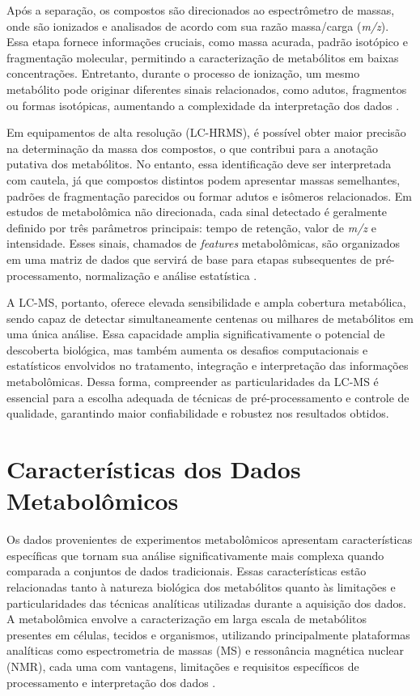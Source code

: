 Após a separação, os compostos são direcionados ao espectrômetro de massas, onde são ionizados e analisados de acordo com sua razão massa/carga (\textit{m/z}). Essa etapa fornece informações cruciais, como massa acurada, padrão isotópico e fragmentação molecular, permitindo a caracterização de metabólitos em baixas concentrações. Entretanto, durante o processo de ionização, um mesmo metabólito pode originar diferentes sinais relacionados, como adutos, fragmentos ou formas isotópicas, aumentando a complexidade da interpretação dos dados \cite{mahieu2017systems}.

Em equipamentos de alta resolução (LC-HRMS), é possível obter maior precisão na determinação da massa dos compostos, o que contribui para a anotação putativa dos metabólitos. No entanto, essa identificação deve ser interpretada com cautela, já que compostos distintos podem apresentar massas semelhantes, padrões de fragmentação parecidos ou formar adutos e isômeros relacionados. Em estudos de metabolômica não direcionada, cada sinal detectado é geralmente definido por três parâmetros principais: tempo de retenção, valor de \textit{m/z} e intensidade. Esses sinais, chamados de \textit{features} metabolômicas, são organizados em uma matriz de dados que servirá de base para etapas subsequentes de pré-processamento, normalização e análise estatística \cite{schrimpe2016untargeted}.

A LC-MS, portanto, oferece elevada sensibilidade e ampla cobertura metabólica, sendo capaz de detectar simultaneamente centenas ou milhares de metabólitos em uma única análise. Essa capacidade amplia significativamente o potencial de descoberta biológica, mas também aumenta os desafios computacionais e estatísticos envolvidos no tratamento, integração e interpretação das informações metabolômicas. Dessa forma, compreender as particularidades da LC-MS é essencial para a escolha adequada de técnicas de pré-processamento e controle de qualidade, garantindo maior confiabilidade e robustez nos resultados obtidos.


\section{\textbf{Características dos Dados Metabolômicos}}

Os dados provenientes de experimentos metabolômicos apresentam características específicas que tornam sua análise significativamente mais complexa quando comparada a conjuntos de dados tradicionais. Essas características estão relacionadas tanto à natureza biológica dos metabólitos quanto às limitações e particularidades das técnicas analíticas utilizadas durante a aquisição dos dados. A metabolômica envolve a caracterização em larga escala de metabólitos presentes em células, tecidos e organismos, utilizando principalmente plataformas analíticas como espectrometria de massas (MS) e ressonância magnética nuclear (NMR), cada uma com vantagens, limitações e requisitos específicos de processamento e interpretação dos dados \cite{chen2022guide}.

